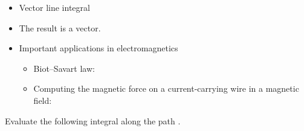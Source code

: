 \begin{ELjoin}

\begin{itemize}
\tightlist
\item
  Vector line integral
\end{itemize}


\begin{itemize}
\tightlist
\item
  The result is a vector.
\item
  Important applications in electromagnetics

  \begin{itemize}
  \item
    Biot--Savart law:
  \item
    Computing the magnetic force on a current-carrying wire in a magnetic field:
  \end{itemize}
\end{itemize}


\begin{ELexample}{}

Evaluate the following integral along the path .



\begin{ELsolution}


\end{ELsolution}

\end{ELexample}

\end{ELjoin}

\ELhold

